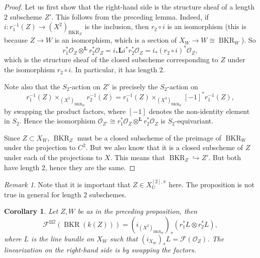 \documentclass{amsart}
\theoremstyle{plain}
\newtheorem{corollary}[theorem]{Corollary}
\theoremstyle{definition}
\theoremstyle{remark}
\newtheorem{remark}[theorem]{Remark}
\begin{document}
    \begin{proof}
        Let us first show that the right-hand side is the structure sheaf of a length $2$ subscheme $Z'$.
        This follows from the preceding lemma.
        Indeed, if $i:r_1^{-1}(Z)\to (X^2)_{\operatorname{BKR}_Z}$ is the inclusion, then $r_2\circ i$ is an isomorphism (this is because $Z\to W$ is an isomorphism, which is a section of $X_W\to W\cong\operatorname{BKR}_W$).
        So
        \[r_1^\ast\mathcal O_Z\otimes^{\mathbf L}r_2^\ast\mathcal O_Z=i_\ast\mathbf Li^\ast r_2^\ast\mathcal O_Z=i_\ast (r_2\circ i)^\ast\mathcal O_Z,\]
        which is the structure sheaf of the closed subscheme corresponding to $Z$ under the isomorphism $r_2\circ i$.
        In particular, it has length $2$.

        Note also that the $S_2$-action on $Z'$ is precisely the $S_2$-action on
        \[r_1^{-1}(Z)\times_{(X^2)_{\operatorname{BKR}_W}}r_2^{-1}(Z)=r_1^{-1}(Z)\times_{(X^2)_{\operatorname{BKR}_W}}[-1]^\ast r_1^{-1}(Z),\]
        by swapping the product factors, where $[-1]$ denotes the non-identity element in $S_2$.
        Hence the isomorphism $\mathcal O_{Z'}\cong r_1^\ast\mathcal O_Z\otimes^{\mathbf L}r_2^\ast\mathcal O_Z$ is $S_2$-equivariant.

        Since $Z\subset X_W$, $\operatorname{BKR}_Z$ must be a closed subscheme of the preimage of $\operatorname{BKR}_W$ under the projection to $C^2$.
        But we also know that it is a closed subscheme of $Z$ under each of the projections to $X$.
        This means that $\operatorname{BKR}_Z\hookrightarrow Z'$.
        But both have length $2$, hence they are the same.
    \end{proof}
    \begin{remark}
        Note that it is important that $Z\in X_U^{[2],\pi}$ here.
        The proposition is not true in general for length $2$ subschemes.
    \end{remark}
    \begin{corollary}
        Let $Z,W$ be as in the preceding proposition, then
        \[\mathcal F^{\boxtimes 2}(\operatorname{BKR}(k(Z)))=(i_{(X^2)_{\operatorname{BKR}_W}})_\ast (r_1^\ast L\otimes r_2^\ast L),\]
        where $L$ is the line bundle on $X_W$ such that $(i_{X_W})_\ast L=\mathcal F(\mathcal O_Z)$.
        The linearization on the right-hand side is by swapping the factors.
    \end{corollary}
\end{document}
